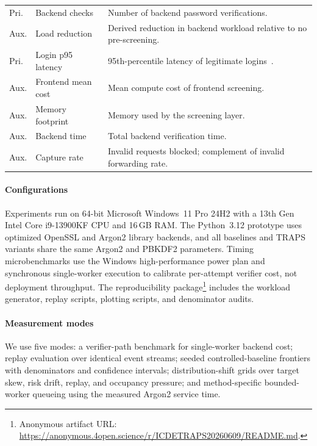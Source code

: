 \begin{table}[t]
\begin{tabularx}{\columnwidth}{@{}p{0.82cm}p{1.95cm}X@{}}
Pri. & Backend checks & Number of backend password verifications. \\
Aux. & Load reduction & Derived reduction in backend workload relative to no pre-screening. \\
Pri. & Login p95 latency & 95th-percentile latency of legitimate logins~\cite{dean2013tail}. \\
Aux. & Frontend mean cost & Mean compute cost of frontend screening. \\
Aux. & Memory footprint & Memory used by the screening layer. \\
Aux. & Backend time & Total backend verification time. \\
Aux. & Capture rate & Invalid requests blocked; complement of invalid forwarding rate. \\
\bottomrule
\end{tabularx}
\label{tab:baseline_metric_compact}
\end{table}

\paragraph{Configurations}
Experiments run on 64-bit Microsoft Windows~11 Pro 24H2 with a 13th Gen Intel Core i9-13900KF CPU and 16\,GB RAM. The Python~3.12 prototype uses optimized OpenSSL and Argon2 library backends, and all baselines and TRAPS variants share the same Argon2 and PBKDF2 parameters. Timing microbenchmarks use the Windows high-performance power plan and synchronous single-worker execution to calibrate per-attempt verifier cost, not deployment throughput. The reproducibility package\footnote{Anonymous artifact URL: \url{https://anonymous.4open.science/r/ICDETRAPS20260609/README.md}.} includes the workload generator, replay scripts, plotting scripts, and denominator audits.

\paragraph{Measurement modes}
We use five modes: a verifier-path benchmark for single-worker backend cost; replay evaluation over identical event streams; seeded controlled-baseline frontiers with denominators and confidence intervals; distribution-shift grids over target skew, risk drift, replay, and occupancy pressure; and method-specific bounded-worker queueing using the measured Argon2 service time.

